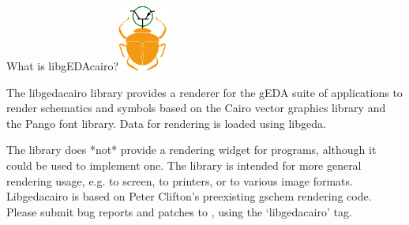  What is libgEDAcairo?\includegraphics[scale=1]{./libgedacairo.png} 

  The libgedacairo library provides a renderer for the gEDA suite of applications to render schematics and symbols based on the Cairo vector graphics library and the Pango font library. Data for rendering is loaded using libgeda. 


  The library does *not* provide a rendering widget for programs, although it could be used to implement one. The library is intended for more general rendering usage, e.g. to screen, to printers, or to various image formats. Libgedacairo is based on Peter Clifton's preexisting gschem rendering code. Please submit bug reports and patches to , using the `libgedacairo' tag. 

